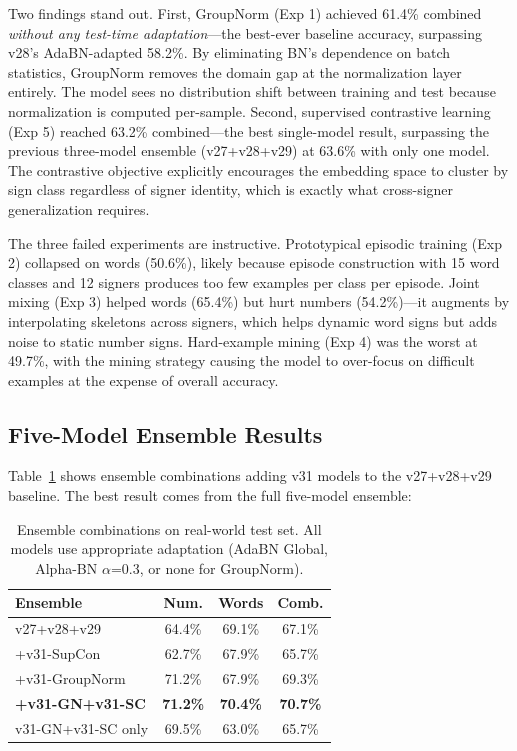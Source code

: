 \documentclass[conference]{IEEEtran}
\begin{document}
Two findings stand out. First, GroupNorm (Exp 1) achieved 61.4\% combined \textit{without any test-time adaptation}---the best-ever baseline accuracy, surpassing v28's AdaBN-adapted 58.2\%. By eliminating BN's dependence on batch statistics, GroupNorm removes the domain gap at the normalization layer entirely. The model sees no distribution shift between training and test because normalization is computed per-sample. Second, supervised contrastive learning (Exp 5) reached 63.2\% combined---the best single-model result, surpassing the previous three-model ensemble (v27+v28+v29) at 63.6\% with only one model. The contrastive objective explicitly encourages the embedding space to cluster by sign class regardless of signer identity, which is exactly what cross-signer generalization requires.

The three failed experiments are instructive. Prototypical episodic training (Exp 2) collapsed on words (50.6\%), likely because episode construction with 15 word classes and 12 signers produces too few examples per class per episode. Joint mixing (Exp 3) helped words (65.4\%) but hurt numbers (54.2\%)---it augments by interpolating skeletons across signers, which helps dynamic word signs but adds noise to static number signs. Hard-example mining (Exp 4) was the worst at 49.7\%, with the mining strategy causing the model to over-focus on difficult examples at the expense of overall accuracy.

\subsection{Five-Model Ensemble Results}
\label{sec:ensemble_results}

Table~\ref{tab:ensemble} shows ensemble combinations adding v31 models to the v27+v28+v29 baseline. The best result comes from the full five-model ensemble:

\begin{table}[t]
\centering
\caption{Ensemble combinations on real-world test set. All models use appropriate adaptation (AdaBN Global, Alpha-BN $\alpha$=0.3, or none for GroupNorm).}
\label{tab:ensemble}
\small
\begin{tabular}{@{}lccc@{}}
\toprule
\textbf{Ensemble} & \textbf{Num.} & \textbf{Words} & \textbf{Comb.} \\
\midrule
v27+v28+v29 & 64.4\% & 69.1\% & 67.1\% \\
+v31-SupCon & 62.7\% & 67.9\% & 65.7\% \\
+v31-GroupNorm & 71.2\% & 67.9\% & 69.3\% \\
\textbf{+v31-GN+v31-SC} & \textbf{71.2\%} & \textbf{70.4\%} & \textbf{70.7\%} \\
v31-GN+v31-SC only & 69.5\% & 63.0\% & 65.7\% \\
\bottomrule
\end{tabular}
\end{table}
\end{document}
